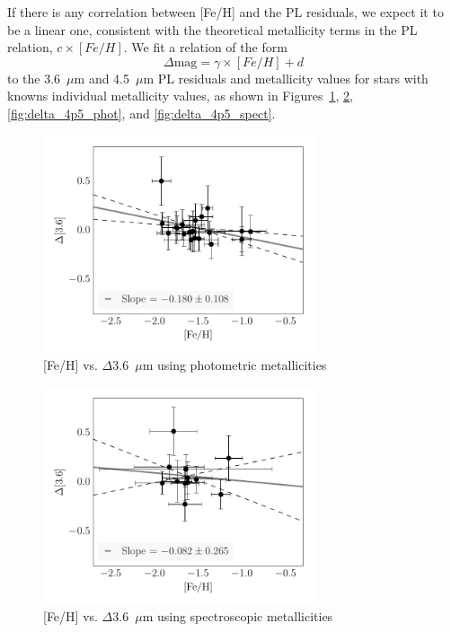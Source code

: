 \documentclass[a4paper,fleqn,usenatbib]{mnras}
\begin{document}
If there is any correlation between [Fe/H] and the PL residuals, we expect it to be a linear one, consistent with the theoretical metallicity terms in the PL relation, $c\times[Fe/H]$. We fit a relation of the form
\begin{equation}
\Delta\text{mag} = \gamma \times[Fe/H] + d
\end{equation}
to the 3.6~$\mu$m and 4.5~$\mu$m PL residuals and metallicity values for stars with knowns individual metallicity values, as shown in Figures~\ref{fig:delta_3p6_phot}, \ref{fig:delta_3p6_spect}, \ref{fig:delta_4p5_phot}, and \ref{fig:delta_4p5_spect}. 

\begin{figure}
\begin{center}
\includegraphics[width=80mm]{final_plots/delta_feh_3p6_phot.pdf}
\caption{[Fe/H] vs. $\Delta$3.6~$\mu$m using photometric metallicities}
\label{fig:delta_3p6_phot}
\end{center}
\end{figure}

\begin{figure}
\begin{center}
\includegraphics[width=80mm]{final_plots/delta_feh_3p6_spect.pdf}
\caption{[Fe/H] vs. $\Delta$3.6~$\mu$m using spectroscopic metallicities}
\label{fig:delta_3p6_spect}
\end{center}
\end{figure}
\end{document}
